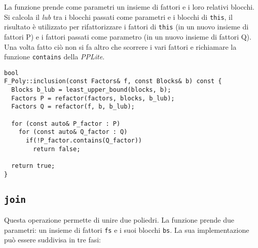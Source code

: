 \documentclass{mimosis}
\theoremstyle{definition}
\begin{document}
La funzione prende come parametri un insieme
di fattori e i loro relativi blocchi. Si calcola il \emph{lub} tra i
blocchi passati come parametri e i blocchi di \texttt{this}, il risultato è utilizzato
per rifattorizzare i fattori di \texttt{this} (in un nuovo insieme di
fattori P) e i fattori passati come parametro (in un nuovo insieme di fattori
Q). Una volta fatto ciò non si fa altro che scorrere i vari fattori e
richiamare la funzione \texttt{contains} della \emph{PPLite}.

\lstset{style=mystyle,language=C++,label= ,caption= ,captionpos=b,numbers=none}
\begin{lstlisting}
bool
F_Poly::inclusion(const Factors& f, const Blocks& b) const {
  Blocks b_lub = least_upper_bound(blocks, b);
  Factors P = refactor(factors, blocks, b_lub);
  Factors Q = refactor(f, b, b_lub);

  for (const auto& P_factor : P)
    for (const auto& Q_factor : Q)
      if(!P_factor.contains(Q_factor))
        return false;

  return true;
}
\end{lstlisting}
\subsection{\texttt{join}}
\label{sec:orgbb10d75}
Questa operazione permette di unire due poliedri. La funzione prende due
parametri: un insieme di fattori \texttt{fs} e i suoi blocchi \texttt{bs}. La sua implementazione può
essere suddivisa in tre fasi:
\end{document}
